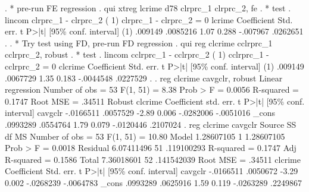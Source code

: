 . * pre-run FE regression
. qui xtreg lcrime d78 clrprc_1 clrprc_2, fe
{\smallskip}
. * test
. lincom clrprc_1 - clrprc_2
{\smallskip}
 ( 1)  clrprc_1 - clrprc_2 = 0
{\smallskip}
      lcrime {\VBAR} Coefficient  Std. err.      t    P>|t|     [95\% conf. interval]
         (1) {\VBAR}    .009149   .0085216     1.07   0.288     -.007967    .0262651
{\smallskip}
. 
. * Try test using FD, pre-run FD regression
. qui reg clcrime cclrprc_1 cclrprc_2, robust
{\smallskip}
. * test
. lincom cclrprc_1 - cclrprc_2
{\smallskip}
 ( 1)  cclrprc_1 - cclrprc_2 = 0
{\smallskip}
     clcrime {\VBAR} Coefficient  Std. err.      t    P>|t|     [95\% conf. interval]
         (1) {\VBAR}    .009149   .0067729     1.35   0.183    -.0044548    .0227529
{\smallskip}
. 
. reg clcrime cavgclr, robust
{\smallskip}
Linear regression                               Number of obs     =         53
                                                F(1, 51)          =       8.38
                                                Prob > F          =     0.0056
                                                R-squared         =     0.1747
                                                Root MSE          =     .34511
{\smallskip}
             {\VBAR}               Robust
     clcrime {\VBAR} Coefficient  std. err.      t    P>|t|     [95\% conf. interval]
     cavgclr {\VBAR}  -.0166511   .0057529    -2.89   0.006    -.0282006   -.0051016
       _cons {\VBAR}   .0993289   .0554764     1.79   0.079    -.0120446    .2107024
{\smallskip}
. reg clcrime cavgclr
{\smallskip}
      Source {\VBAR}       SS           df       MS      Number of obs   =        53
   F(1, 51)        =     10.80
       Model {\VBAR}  1.28607105         1  1.28607105   Prob > F        =    0.0018
    Residual {\VBAR}  6.07411496        51  .119100293   R-squared       =    0.1747
   Adj R-squared   =    0.1586
       Total {\VBAR}  7.36018601        52  .141542039   Root MSE        =    .34511
{\smallskip}
     clcrime {\VBAR} Coefficient  Std. err.      t    P>|t|     [95\% conf. interval]
     cavgclr {\VBAR}  -.0166511   .0050672    -3.29   0.002    -.0268239   -.0064783
       _cons {\VBAR}   .0993289   .0625916     1.59   0.119    -.0263289    .2249867
{\smallskip}
